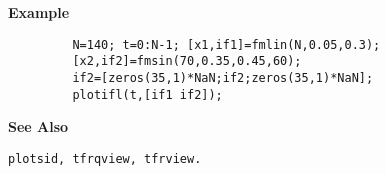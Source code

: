 {\bf \large \sf Example}
\begin{verbatim}
         N=140; t=0:N-1; [x1,if1]=fmlin(N,0.05,0.3); 
         [x2,if2]=fmsin(70,0.35,0.45,60);
         if2=[zeros(35,1)*NaN;if2;zeros(35,1)*NaN];
         plotifl(t,[if1 if2]);
\end{verbatim}
\vspace*{.5cm}


{\bf \large \sf See Also}\\
\hspace*{1.5cm}
\begin{minipage}[t]{13.5cm}
\begin{verbatim}
plotsid, tfrqview, tfrview.
\end{verbatim}
\end{minipage}

 
